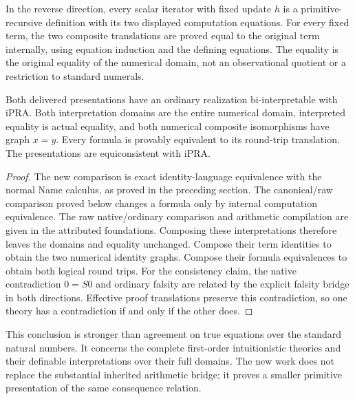 In the reverse direction, every scalar iterator with fixed update $h$ is a
primitive-recursive definition with its two displayed computation equations.
For every fixed term, the two composite translations are proved equal to
the original term internally, using equation induction and the defining
equations. The equality is the original equality of the numerical domain,
not an observational quotient or a restriction to standard numerals.

\begin{theorem}
Both delivered presentations have an ordinary realization bi-interpretable
with iPRA. Both interpretation domains are the entire numerical domain,
interpreted equality is actual equality, and both numerical composite
isomorphisms have graph $x=y$. Every formula is provably equivalent to its
round-trip translation. The presentations are equiconsistent with iPRA.
\end{theorem}
\begin{proof}
The new comparison is exact identity-language equivalence with the normal
Name calculus, as proved in the preceding section. The canonical/raw
comparison proved below changes a formula only by internal computation
equivalence. The raw native/ordinary comparison and arithmetic compilation
are given in the attributed foundations. Composing these interpretations
therefore leaves the domains and equality unchanged. Compose their term
identities to obtain the two numerical identity graphs. Compose their
formula equivalences to obtain both logical round trips. For the consistency
claim, the native contradiction $0=S0$ and ordinary falsity are related by
the explicit falsity bridge in both directions. Effective proof translations
preserve this contradiction, so one theory has a contradiction if and only
if the other does.
\end{proof}

This conclusion is stronger than agreement on true equations over the
standard natural numbers. It concerns the complete first-order intuitionistic
theories and their definable interpretations over their full domains.
The new work does not replace the substantial inherited arithmetic bridge;
it proves a smaller primitive presentation of the same consequence relation.
